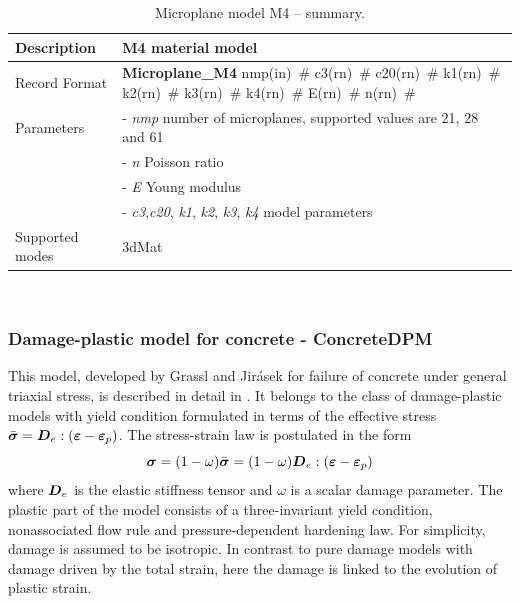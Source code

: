 \documentclass[a4paper]{article}
\newcommand{\mbf}[1]{\mbox{\boldmath$#1$}}
\newcommand{\descitem}[1]{{\noindent \bf #1}}
\newcommand{\elemparam}[2]{{{#1\tiny (#2)}~\#}}
\newcommand{\param}[1]{{\it #1}}
\newcommand{\veps}{\mbf{\varepsilon}}  %
\newcommand{\vsig}{\mbf{\sigma}}%
\newenvironment{mmt}{\begin{tabular}{|l|p{9cm}|}}{\end{tabular}\\}
\newenvironment{mmt}{\begin{tabular}{|l|l|}}{\end{tabular}\\}
\begin{document}
\begin{table}[!htb]
\begin{mmt}
\hline
Description & M4 material model\\
\hline
Record Format & \descitem{Microplane\_M4}  \elemparam{nmp}{in}
\elemparam{c3}{rn} \elemparam{c20}{rn} \elemparam{k1}{rn}
\elemparam{k2}{rn} \elemparam{k3}{rn} \elemparam{k4}{rn}
\elemparam{E}{rn} \elemparam{n}{rn} \\
Parameters &- \param{nmp} number of microplanes, supported values are
21, 28 and 61\\
&- \param{n} Poisson ratio\\
&- \param{E} Young modulus \\
&- \param{c3},\param{c20}, \param{k1}, \param{k2}, \param{k3},
\param{k4}  model parameters\\
Supported modes& 3dMat\\
\hline
\end{mmt}
\caption{Microplane model M4 -- summary.}
\label{m4_table}
\end{table}

\newcommand{\beq}{\begin{equation}}
\newcommand{\eeq}{\end{equation}}
\newcommand{\fc}{\bar{f}_c}
\newcommand{\ft}{\bar{f}_t}
\newcommand{\mD}{\mbf{D}}
\newcommand{\qh}{q_{\rm h}}

\subsubsection{Damage-plastic model for concrete - ConcreteDPM} \label{sec:cdpm}

This model, developed by Grassl and Jir\'{a}sek for failure of concrete
under general triaxial stress, is described in detail in \cite{GraJir}.
It belongs to the class of damage-plastic models with yield condition formulated
in terms of the effective stress $\bar{\vsig}=\mD_e:(\veps-\veps_p)$.
The stress-strain law is postulated in the form 
\beq
\vsig = (1-\omega)\bar{\vsig}=(1-\omega)\mD_e:(\veps-\veps_p)
\eeq
where $\mD_e$ is the elastic stiffness tensor
and $\omega$ is a scalar damage parameter. 
The plastic part of the model consists of a three-invariant yield condition, nonassociated flow rule and pressure-dependent hardening law. 
For simplicity, damage is assumed to be isotropic.
In contrast to pure damage models with damage driven by the total strain, here the damage is linked to the evolution of plastic strain.
\end{document}
